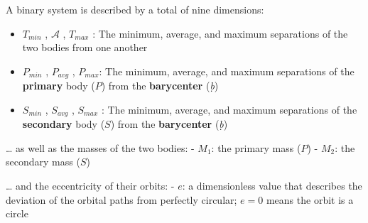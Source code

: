 \documentclass[
  letterpaper,
]{book}
\providecommand{\tightlist}{%
  \setlength{\itemsep}{0pt}\setlength{\parskip}{0pt}}
\begin{document}
A binary system is described by a total of nine dimensions:

\begin{itemize}
\tightlist
\item
  \(T_{min}\) , \(\mathcal{A}\) , \(T_{max}\) : The minimum, average,
  and maximum separations of the two bodies from one another
\item
  \(P_{min}\) , \(P_{avg}\) , \(P_{max}\): The minimum, average, and
  maximum separations of the \textbf{primary} body (\(P\)) from the
  \textbf{barycenter} (\emph{ḅ})
\item
  \(S_{min}\) , \(S_{avg}\) , \(S_{max}\) : The minimum, average, and
  maximum separations of the \textbf{secondary} body (\(S\)) from the
  \textbf{barycenter} (\emph{ḅ})
\end{itemize}

\ldots{} as well as the masses of the two bodies: - \(M_1\): the primary
mass (\(P\)) - \(M_2\): the secondary mass (\(S\))

\ldots{} and the eccentricity of their orbits: - \(e\): a dimensionless
value that describes the deviation of the orbital paths from perfectly
circular; \(e = 0\) means the orbit is a circle
\end{document}

